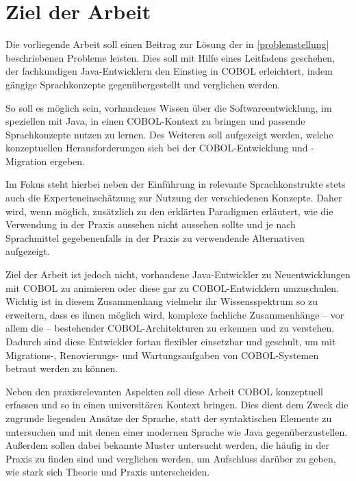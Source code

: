 \section{Ziel der Arbeit}
Die vorliegende Arbeit soll einen Beitrag zur Lösung der in \autoref{problemstellung} beschriebenen Probleme leisten. Dies soll mit Hilfe eines Leitfadens geschehen, der fachkundigen Java-Entwicklern den Einstieg in COBOL erleichtert, indem gängige Sprachkonzepte gegenübergestellt und verglichen werden. 

So soll es möglich sein, vorhandenes Wissen über die Softwareentwicklung, im speziellen mit Java, in einen COBOL-Kontext zu bringen und passende Sprachkonzepte nutzen zu lernen. Des Weiteren soll aufgezeigt werden, welche konzeptuellen Herausforderungen sich bei der COBOL-Entwicklung und -Migration ergeben.

Im Fokus steht hierbei neben der Einführung in relevante Sprachkonstrukte stets auch die Experteneinschätzung zur Nutzung der verschiedenen Konzepte. Daher wird, wenn möglich, zusätzlich zu den erklärten Paradigmen erläutert, wie die Verwendung in der Praxis aussehen \bzw nicht aussehen sollte und je nach Sprachmittel gegebenenfalls in der Praxis zu verwendende Alternativen aufgezeigt.

Ziel der Arbeit ist jedoch nicht, vorhandene Java-Entwickler zu Neuentwicklungen mit COBOL zu animieren oder diese gar zu COBOL-Entwicklern umzuschulen. Wichtig ist in diesem Zusammenhang vielmehr ihr Wissensspektrum so zu erweitern, dass es ihnen möglich wird, komplexe fachliche Zusammenhänge -- vor allem die  -- bestehender COBOL-Architekturen zu erkennen und zu verstehen. Dadurch sind diese Entwickler fortan flexibler einsetzbar und geschult, um mit Migrations-, Renovierungs- und Wartungsaufgaben von COBOL-Systemen betraut werden zu können.

Neben den praxisrelevanten Aspekten soll diese Arbeit COBOL konzeptuell erfassen und so in einen universitären Kontext bringen. Dies dient dem Zweck die zugrunde liegenden Ansätze der Sprache, statt der syntaktischen Elemente zu untersuchen und mit denen einer modernen Sprache wie Java gegenüberzustellen. Außerdem sollen dabei bekannte Muster untersucht werden, die häufig in der Praxis zu finden sind und verglichen werden, um Aufschluss darüber zu geben, wie stark sich Theorie und Praxis unterscheiden. 